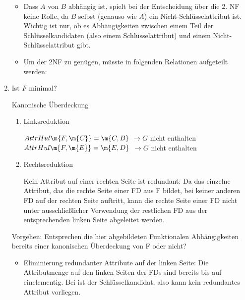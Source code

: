 \documentclass{bschlangaul-aufgabe}
\begin{document}
\begin{enumerate}
\begin{bAntwort}
\begin{itemize}
\item Dass $A$ von $B$ abhängig ist, spielt bei der Entscheidung über
die 2. NF keine Rolle, da $B$ selbst (genauso wie $A$) ein
Nicht-Schlüsselattribut ist. Wichtig ist nur, ob es Abhängigkeiten
zwischen einem Teil der Schlüsselkandidaten (also einem
Schlüsselattribut) und einem Nicht-Schlüsselattribut gibt.

\item Um der 2NF zu genügen, müsste in folgenden Relationen aufgeteilt
werden:

\end{itemize}

\end{bAntwort}


\item Ist $F$ minimal?


\begin{bAntwort}
Kanonische Überdeckung

\begin{enumerate}
\item Linksreduktion

$AttrHul\m{F, \m{C}} = \m{C, B}$ $\rightarrow G$ nicht enthalten\\
$AttrHul\m{F, \m{E}} = \m{E, D}$ $\rightarrow G$ nicht enthalten

\item Rechtsreduktion

Kein Attribut auf einer rechten Seite ist redundant: Da das einzelne
Attribut, das die rechte Seite einer FD aus F bildet, bei keiner anderen
FD auf der rechten Seite auftritt, kann die rechte Seite einer FD nicht
unter ausschließlicher Verwendung der restlichen FD aus der
entsprechenden linken Seite abgeleitet werden.
\end{enumerate}

\end{bAntwort}

\begin{bAntwort}
Vorgehen: Entsprechen die hier abgebildeten Funktionalen Abhängigkeiten
bereits einer kanonischen Überdeckung von F oder nicht?

\begin{itemize}
\item Eliminierung redundanter Attribute auf der linken Seite: Die
Attributmenge auf den linken Seiten der FDs sind bereits bis auf
 einelementig. Bei  ist  der
Schlüsselkandidat, also kann kein redundantes Attribut vorliegen.


\end{itemize}
\end{bAntwort}
\end{enumerate}
\end{document}
